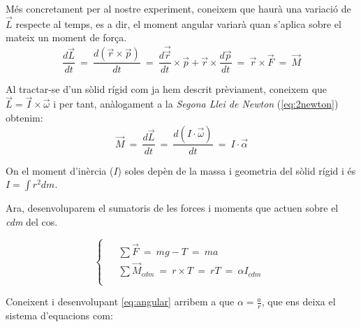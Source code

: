 \documentclass[11pt]{article}
\begin{document}
        Més concretament per al nostre experiment, coneixem que haurà una variació de $\vec{L}$ respecte al temps, es a dir, el moment angular variarà quan s'aplica sobre el mateix un moment de força.
        \vspace{-0.05cm}
        \begin{equation}
            \frac{d\vec{L}}{dt}\ =\ \frac{d\left(\vec{r}\times\vec{p}\right)}{dt}\ =\ \frac{d\vec{\vec{r}}}{dt}\times\vec{p}+\vec{r}\times\frac{d\vec{p}}{dt}\ =\ \vec{r}\times\vec{F}\ =\ \vec{M}
        \end{equation}
    
        Al tractar-se d'un sòlid rígid com ja hem descrit prèviament, coneixem que $\vec{L}=\vec{I}\times\vec{\omega}$ i per tant, anàlogament a la \textit{Segona Llei de Newton} (\ref{eq:2newton}) obtenim:
        \vspace{-0.05cm}
        \begin{equation}
            \vec{M}\ =\ \frac{d\vec{L}}{dt}\ =\ \frac{d\left(I\cdot\vec{\omega}\right)}{dt}\ =\ I\cdot\vec{\alpha}
        \end{equation}
    
        On el moment d'inèrcia ($I$) soles depèn de la massa i geometria del sòlid rígid i és $I=\int r^2 dm$.
    
        \vspace{1cm}Ara, desenvoluparem el sumatoris de les forces i moments que actuen sobre el \textit{cdm} del cos. 
    
        \begin{equation}
            \begin{cases}\begin{aligned}
                  & \sum\vec{F}\ =\ mg  -   T\ =\ ma\\
                  & \sum\vec{M}_{\textit{cdm}}\ =\ r\times T\ =\ rT\ =\ \alpha I_{\textit{cdm}}\\
            \end{aligned}\end{cases}
            \label{eq:sumatorios}
        \end{equation}
    
        Coneixent i desenvolupant \ref{eq:angular} arribem a que $\alpha=\frac{a}{r}$, que ens deixa el sistema d'equacions com:
    
\end{document}
